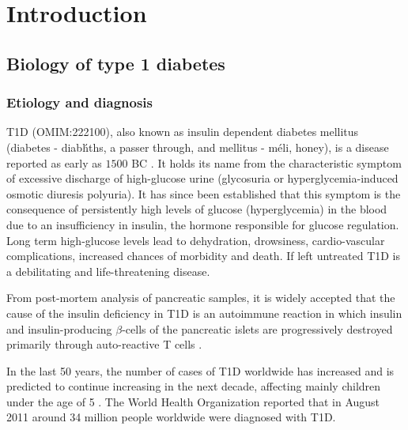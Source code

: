 %

\chapter[Introduction]{ \label{chapter:intro} Introduction}

\section{Biology of type 1 diabetes}

\subsection{Etiology and diagnosis}

\Gls{T1D} (OMIM:222100), also known as insulin dependent diabetes mellitus (diabetes - \foreignlanguage{greek}{diab\'hths},
a passer through, and mellitus - \foreignlanguage{greek}{m\'eli}, honey), is a disease reported as early as $1500$ BC \citep{Poretsky:2010wr}.
It holds its name from the characteristic symptom of excessive discharge of high-glucose urine (glycosuria or hyperglycemia-induced osmotic diuresis polyuria).
It has since been established that this symptom is the consequence of persistently high levels of glucose (hyperglycemia) in the blood due to an insufficiency in insulin,
the hormone responsible for glucose regulation.
Long term high-glucose levels lead to dehydration, drowsiness, cardio-vascular complications, increased chances of morbidity and death.  
If left untreated T1D is a debilitating and life-threatening disease.

From post-mortem analysis of pancreatic samples,
it is widely accepted that the cause of the insulin deficiency in \gls{T1D} is an autoimmune reaction
in which insulin and insulin-producing $\beta$-cells of the pancreatic islets
are progressively destroyed primarily through auto-reactive T cells \citep{Todd:2010bl}.  

In the last 50 years, the number of cases of T1D worldwide has increased and is predicted to continue increasing in the next decade,
affecting mainly children under the age of 5 \citep{Patterson:2009gj}.
The World Health Organization reported that in August 2011 around 34 million people worldwide were diagnosed with T1D.

